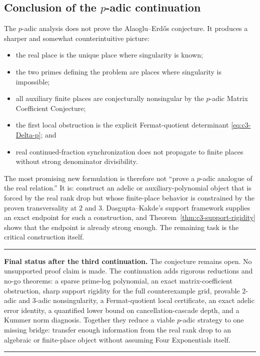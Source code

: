 \documentclass[11pt,oneside]{article}
\theoremstyle{definition}
\theoremstyle{remark}
\newenvironment{resultbox}
{\begin{center}\begin{minipage}{0.94\textwidth}\hrule\vspace{0.45em}}
{\vspace{0.35em}\hrule\end{minipage}\end{center}}
\begin{document}
\subsection{Conclusion of the \texorpdfstring{$p$}{p}-adic continuation}

The $p$-adic analysis does not prove the Alaoglu--Erd\H{o}s conjecture.  It produces a sharper
and somewhat counterintuitive picture:
\begin{itemize}
\item the real place is the unique place where singularity is known;
\item the two primes defining the problem are places where singularity is impossible;
\item all auxiliary finite places are conjecturally nonsingular by the $p$-adic Matrix
      Coefficient Conjecture;
\item the first local obstruction is the explicit Fermat-quotient determinant
      \eqref{eq:c3-Delta-p}; and
\item real continued-fraction synchronization does not propagate to finite places without
      strong denominator divisibility.
\end{itemize}

The most promising new formulation is therefore not ``prove a $p$-adic analogue of the real
relation.''  It is: construct an adelic or auxiliary-polynomial object that is forced by the
real rank drop but whose finite-place behavior is constrained by the proven transversality at
$2$ and $3$.  Dasgupta--Kakde's support framework supplies an exact endpoint for such a
construction, and Theorem~\ref{thm:c3-support-rigidity} shows that the endpoint is already
strong enough.  The remaining task is the critical construction itself.

\begin{resultbox}
\textbf{Final status after the third continuation.}
The conjecture remains open.  No unsupported proof claim is made.  The continuation adds
rigorous reductions and no-go theorems: a sparse prime-log polynomial, an exact
matrix-coefficient obstruction, sharp support rigidity for the full counterexample grid,
provable $2$-adic and $3$-adic nonsingularity, a Fermat-quotient local certificate, an exact
adelic error identity, a quantified lower bound on cancellation-cascade depth, and a Kummer
norm diagnosis.  Together they reduce a viable $p$-adic strategy to one missing bridge:
transfer enough information from the real rank drop to an algebraic or finite-place object
without assuming Four Exponentials itself.
\end{resultbox}
\end{document}
